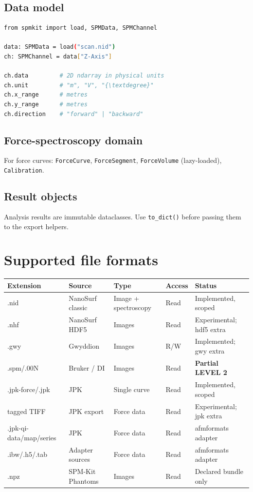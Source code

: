 \documentclass[a4paper,11pt]{article}
\begin{document}
\subsection{Data model}

\begin{lstlisting}[language=bash]
from spmkit import load, SPMData, SPMChannel

data: SPMData = load("scan.nid")
ch: SPMChannel = data["Z-Axis"]

ch.data         # 2D ndarray in physical units
ch.unit         # "m", "V", "{\textdegree}"
ch.x_range      # metres
ch.y_range      # metres
ch.direction    # "forward" | "backward"
\end{lstlisting}

\subsection{Force-spectroscopy domain}

For force curves: \texttt{ForceCurve}, \texttt{ForceSegment}, \texttt{ForceVolume}
(lazy-loaded), \texttt{Calibration}.

\subsection{Result objects}
Analysis results are immutable dataclasses. Use \texttt{to\_dict()} before passing
them to the export helpers.

\section{Supported file formats}

\begin{longtable}{@{}>{\raggedright\arraybackslash}p{2.8cm} p{3.0cm} p{2.5cm} p{2.0cm} p{3.8cm}@{}}
\toprule
Extension & Source & Type & Access & Status \\
\midrule
.nid & NanoSurf classic & Image + spectroscopy & Read & Implemented, scoped \\
.nhf & NanoSurf HDF5 & Images & Read & Experimental; hdf5 extra \\
.gwy & Gwyddion & Images & R/W & Implemented; gwy extra \\
.spm/.00N & Bruker / DI & Images & Read & \textbf{Partial LEVEL 2} \\
.jpk-force/.jpk & JPK & Single curve & Read & Implemented, scoped \\
tagged TIFF & JPK export & Force data & Read & Experimental; jpk extra \\
.jpk-qi-data/map/series & JPK & Force data & Read & afmformats adapter \\
.ibw/.h5/.tab & Adapter sources & Force data & Read & afmformats adapter \\
.npz & SPM-Kit Phantoms & Images & Read & Declared bundle only \\
\bottomrule
\end{longtable}
\end{document}
